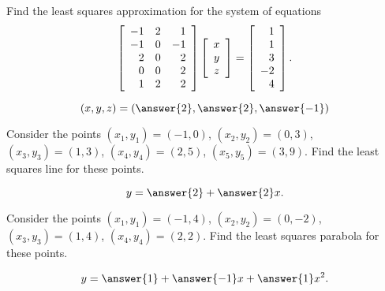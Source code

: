 \documentclass{ximera}
\author{Zack Reed}
\begin{document}

\begin{problem}
  Find the least squares approximation for the system of equations
  \begin{equation*}
    \startmat{rrr}
      -1 & 2 & 1 \\
      -1 & 0 & -1 \\
      2 & 0 & 2 \\
      0 & 0 & 2 \\
      1 & 2 & 2 \\
    \stopmat
    \startmat{c} x \\ y \\ z \stopmat
    =
    \startmat{r} 1 \\ 1 \\ 3 \\ -2 \\ 4 \stopmat.
  \end{equation*}

    $$(x,y,z) = (\answer{2},\answer{2},\answer{-1})$$

\end{problem}

\begin{problem}
  Consider the points $(x_1,y_1) = (-1,0)$, $(x_2,y_2) = (0,3)$,
  $(x_3,y_3) = (1,3)$, $(x_4,y_4) = (2,5)$, $(x_5,y_5) = (3,9)$.  Find
  the least squares line for these points.

    $$y = \answer{2}+\answer{2}x.$$

\end{problem}

\begin{problem}
  Consider the points $(x_1,y_1) = (-1,4)$, $(x_2,y_2) = (0,-2)$,
  $(x_3,y_3) = (1,4)$, $(x_4,y_4) = (2,2)$.  Find the least squares
  parabola for these points.

    $$y = \answer{1}+\answer{-1}x+\answer{1}x^2.$$

\end{problem}
\end{document}
